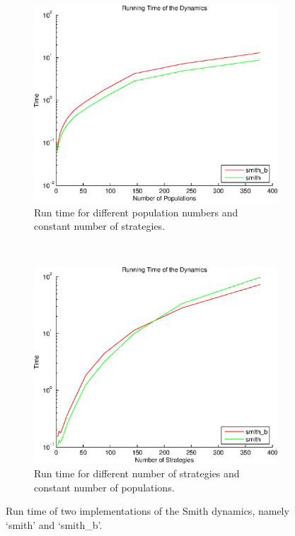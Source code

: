 \documentclass[a4paper,10pt]{article}
\begin{document}
\begin{figure}
        \centering
        \begin{subfigure}[b]{0.45\textwidth}
                \includegraphics[width=\textwidth]{./images/running_time_smith_pop.eps}
                \caption{Run time for different population numbers and constant number of strategies.}
                \label{fig:smith_run_time_pop}
        \end{subfigure}%
        ~ 
        \begin{subfigure}[b]{0.45\textwidth}
                \includegraphics[width=\textwidth]{./images/running_time_smith_str.eps}
                \caption{Run time for different number  of strategies and constant number of populations.}
                \label{fig:smith_run_time_str}
        \end{subfigure}%

        \caption{Run time of two implementations of the Smith dynamics, namely `smith' and `smith\_b'.}
        \label{fig:smith_run_time}
\end{figure}
\end{document}

